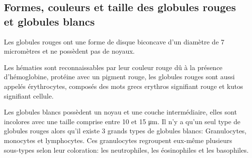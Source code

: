 \subsection{Formes, couleurs et taille des globules rouges et globules blancs}

Les globules rouges ont une forme de disque biconcave d’un diamètre de 7 micromètres et ne possèdent pas de noyaux.

Les hématies sont reconnaissables par leur couleur rouge dû à la présence d’hémoglobine, protéine avec un pigment rouge, les globules rouges sont aussi appelés érythrocytes, composés des mots grecs erythros signifiant rouge et kutos signifiant cellule.

Les globules blancs possèdent un noyau et une couche intermédiaire, elles sont incolores avec une taille comprise entre 10 et 15 μm. 
Il n'y a qu'un seul type de globules rouges alors qu'il existe 3 grands types de globules blancs: 	
Granulocytes, monocytes et lymphocytes.
Ces granulocytes regroupent eux-même plusieurs sous-types selon leur coloration: les neutrophiles, les éosinophiles et les basophiles.
\\


\newpage